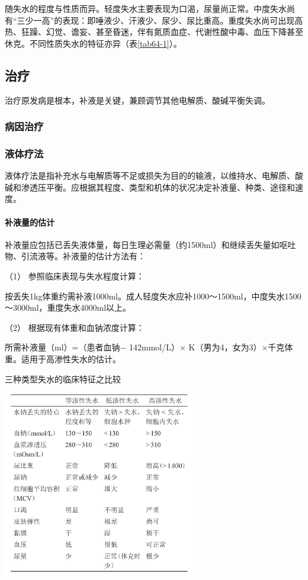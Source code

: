 随失水的程度与性质而异。轻度失水主要表现为口渴，尿量尚正常。中度失水尚有“三少一高”的表现：即唾液少、汗液少、尿少、尿比重高。重度失水尚可出现高热、狂躁、幻觉、谵妄、甚至昏迷，伴有氮质血症、代谢性酸中毒、血压下降甚至休克。不同性质失水的特征亦异（表\ref{tab64-1}）。

\subsection{治疗}

治疗原发病是根本，补液是关键，兼顾调节其他电解质、酸碱平衡失调。

\subsubsection{病因治疗}

\subsubsection{液体疗法}

液体疗法是指补充水与电解质等不足或损失为目的的输液，以维持水、电解质、酸碱和渗透压平衡。应根据其程度、类型和机体的状况决定补液量、种类、途径和速度。

\paragraph{补液量的估计}

补液量应包括已丢失液体量，每日生理必需量（约1500ml）和继续丢失量如呕吐物、引流液等。补液量的估计方法有：

\hypertarget{text00190.htmlux5cux23CHP6-1-1-3-2-1-1}{}
（1） 参照临床表现与失水程度计算：

按丢失1kg体重约需补液1000ml。成人轻度失水应补1000～1500ml，中度失水1500～3000ml，重度失水4000ml以上。

\hypertarget{text00190.htmlux5cux23CHP6-1-1-3-2-1-2}{}
（2） 根据现有体重和血钠浓度计算：

所需补液量（ml）=（患者血钠− 142mmol/L）×
K（男为4，女为3）×千克体重。适用于高渗性失水的估计。

\begin{table}[htbp]
\centering
\caption{三种类型失水的临床特征之比较}
\label{tab64-1}
\includegraphics[width=3.40625in,height=3.20833in]{./images/Image00239.jpg}
\end{table}


